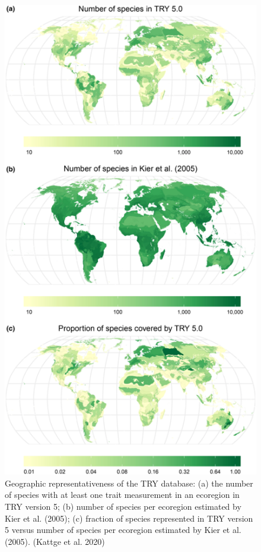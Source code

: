 \documentclass[
  12pt,
  oneside]{book}
\begin{document}
\begin{figure}

{\centering \includegraphics[width=0.8\linewidth]{figures/chap7/f79_try_kier} 

}

\caption{Geographic representativeness of the TRY database: (a) the number of species with at least one trait measurement in an ecoregion in TRY version 5; (b) number of species per ecoregion estimated by Kier et al. (2005); (c) fraction of species represented in TRY version 5 versus number of species per ecoregion estimated by Kier et al. (2005). (Kattge et al. 2020)}\label{fig:f79}
\end{figure}
\end{document}
